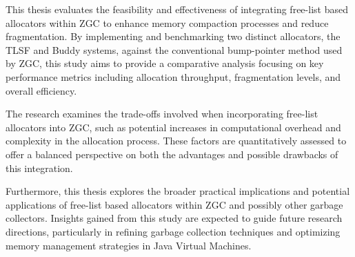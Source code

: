 This thesis evaluates the feasibility and effectiveness of integrating free-list based allocators within ZGC to enhance memory compaction processes and reduce fragmentation. By implementing and benchmarking two distinct allocators, the TLSF and Buddy systems, against the conventional bump-pointer method used by ZGC, this study aims to provide a comparative analysis focusing on key performance metrics including allocation throughput, fragmentation levels, and overall efficiency.

The research examines the trade-offs involved when incorporating free-list allocators into ZGC, such as potential increases in computational overhead and complexity in the allocation process. These factors are quantitatively assessed to offer a balanced perspective on both the advantages and possible drawbacks of this integration.

Furthermore, this thesis explores the broader practical implications and potential applications of free-list based allocators within ZGC and possibly other garbage collectors. Insights gained from this study are expected to guide future research directions, particularly in refining garbage collection techniques and optimizing memory management strategies in Java Virtual Machines.

